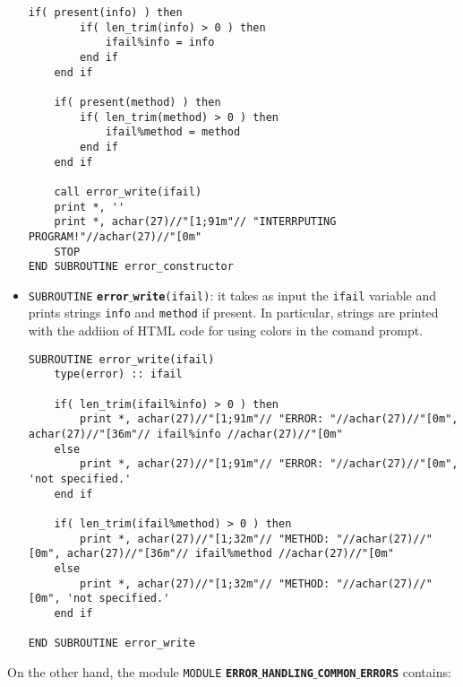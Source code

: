 \documentclass[rmp,10pt,onecolumn,fleqn,notitlepage]{revtex4-1}
\begin{document}
\begin{itemize}
\begin{minipage}[t]{0.76\linewidth}
\begin{lstlisting}[style=Fortran]
    if( present(info) ) then
        if( len_trim(info) > 0 ) then
            ifail%info = info
        end if
    end if

    if( present(method) ) then
        if( len_trim(method) > 0 ) then
            ifail%method = method
        end if
    end if

    call error_write(ifail)
    print *, ''
    print *, achar(27)//"[1;91m"// "INTERRPUTING PROGRAM!"//achar(27)//"[0m"
    STOP
END SUBROUTINE error_constructor\end{lstlisting}
    \end{minipage}

    \item \texttt{SUBROUTINE} {\bfseries\texttt{error$\_$write}}\texttt{(ifail)}: it takes as input the \texttt{ifail} variable and prints strings \texttt{info} and \texttt{method} if present. In particular, strings are printed with the addiion of HTML code for using colors in the comand prompt.

    \begin{minipage}[t]{0.9\linewidth}%
    \begin{lstlisting}[style=Fortran]
SUBROUTINE error_write(ifail)
    type(error) :: ifail

    if( len_trim(ifail%info) > 0 ) then
        print *, achar(27)//"[1;91m"// "ERROR: "//achar(27)//"[0m", achar(27)//"[36m"// ifail%info //achar(27)//"[0m"
    else
        print *, achar(27)//"[1;91m"// "ERROR: "//achar(27)//"[0m", 'not specified.'
    end if

    if( len_trim(ifail%method) > 0 ) then
        print *, achar(27)//"[1;32m"// "METHOD: "//achar(27)//"[0m", achar(27)//"[36m"// ifail%method //achar(27)//"[0m"
    else
        print *, achar(27)//"[1;32m"// "METHOD: "//achar(27)//"[0m", 'not specified.'
    end if

END SUBROUTINE error_write\end{lstlisting}
    \end{minipage}

\end{itemize}

On the other hand, the module \texttt{MODULE} {\bfseries\texttt{ERROR$\_$HANDLING$\_$COMMON$\_$ERRORS}} contains:
\end{document}
